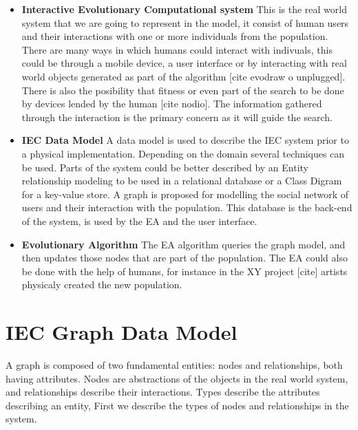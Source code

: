 \documentclass[conference]{IEEEtran}
\begin{document}
\begin{itemize}
  \item {\bf Interactive Evolutionary Computational system} 
  This is the real world system that we are going to represent in the model, 
  it consist of human users and their interactions with one or more individuals
  from
  the population. There are many ways in which humans could interact 
  with indivuals, this could be through a mobile device, a user interface 
  or by interacting with real world objects generated as part of the algorithm 
  [cite evodraw o unplugged].
  There is also the posibility that fitness or even part of the search 
  to be done by devices lended by the human [cite nodio].
  The information gathered through the interaction is the primary concern
  as it will guide the search. 

  \item {\bf IEC Data Model}
  A data model is used to describe the IEC system prior to a physical 
  implementation. 
  Depending on the domain several techniques can be used.
  Parts of the system could be better described by an Entity relationship 
  modeling to be used in a relational database or a Class Digram for a 
  key-value store. 
  A graph is proposed for modelling the social network
  of users and their interaction with the population. This database 
  is the back-end of the system, is used by the EA and the user interface. 

  \item {\bf Evolutionary Algorithm} 
  The EA algorithm queries the graph model, and then updates those nodes that 
  are part of the population. The EA could also be done with the help of
  humans, for instance in the XY project [cite] artists physicaly created
  the new population.  
\end{itemize}


\section{IEC Graph Data Model} 

A graph is composed of two fundamental entities: nodes and relationships,
both having attributes. Nodes are abstractions of the objects in the real 
world system, and relationships describe their interactions. Types describe
the attributes describing an entity, First we describe the types of nodes and  relationships in the system. 
\end{document}
